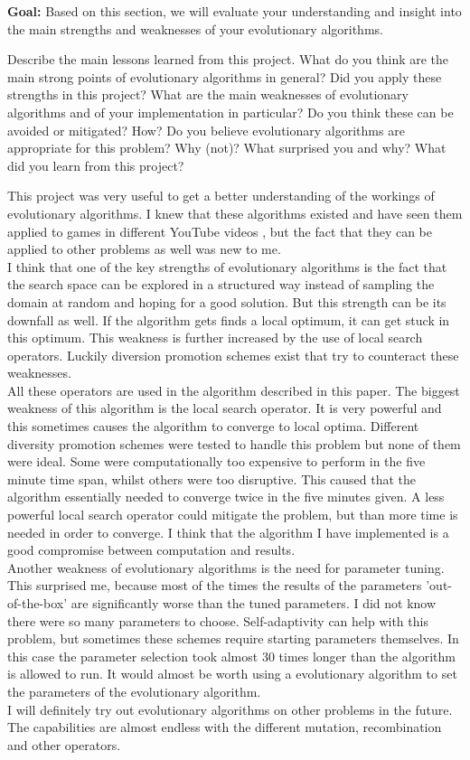 \documentclass[a4paper,10pt]{article}
\newcommand{\ReplaceMe}[1]{{\color{blue}#1}}
\newcommand{\RemoveMe}[1]{{\color{purple}#1}}
\begin{document}
\RemoveMe{\textbf{Goal:} Based on this section, we will evaluate your understanding and insight into the main strengths and weaknesses of your evolutionary algorithms.}

\ReplaceMe{Describe the main lessons learned from this project. What do you think are the main strong points of evolutionary algorithms in general? Did you apply these strengths in this project? What are the main weaknesses of evolutionary algorithms and of your implementation in particular? Do you think these can be avoided or mitigated? How? Do you believe evolutionary algorithms are appropriate for this problem? Why (not)? What surprised you and why? What did you learn from this project?}

This project was very useful to get a better understanding of the workings of evolutionary algorithms. I knew that these algorithms existed and have seen them applied to games in different YouTube videos \cite{video1, video2}, but the fact that they can be applied to other problems as well was new to me. \\
I think that one of the key strengths of evolutionary algorithms is the fact that the search space can be explored in a structured way instead of sampling the domain at random and hoping for a good solution. But this strength can be its downfall as well. If the algorithm gets finds a local optimum, it can get stuck in this optimum. This weakness is further increased by the use of local search operators. Luckily diversion promotion schemes exist that try to counteract these weaknesses.\\
All these operators are used in the algorithm described in this paper. The biggest weakness of this algorithm is the local search operator. It is very powerful and this sometimes causes the algorithm to converge to local optima. Different diversity promotion schemes were tested to handle this problem but none of them were ideal. Some were computationally too expensive to perform in the five minute time span, whilst others were too disruptive. This caused that the algorithm essentially needed to converge twice in the five minutes given. A less powerful local search operator could mitigate the problem, but than more time is needed in order to converge. I think that the algorithm I have implemented is a good compromise between computation and results.\\
Another weakness of evolutionary algorithms is the need for parameter tuning.  This surprised me, because most of the times the results of the parameters 'out-of-the-box' are significantly worse than the tuned parameters. I did not know there were so many parameters to choose. Self-adaptivity can help with this problem, but sometimes these schemes require starting parameters themselves. In this case the parameter selection took almost 30 times longer than the algorithm is allowed to run. It would almost be worth using a evolutionary algorithm to set the parameters of the evolutionary algorithm.\\
I will definitely try out evolutionary algorithms on other problems in the future. The capabilities are almost endless with the different mutation, recombination and other operators. 
\end{document}
